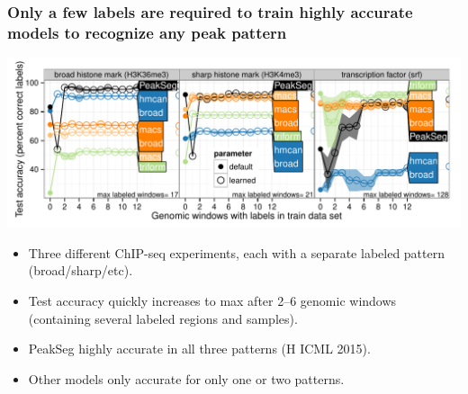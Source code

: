\documentclass{beamer}
\begin{document}
\begin{frame}
  \frametitle{Only a few labels are required to train highly accurate models to recognize any peak pattern}
  \includegraphics[width=1.1\textwidth]{figure-test-error-decreases-mean.pdf}
 
  \begin{itemize}
  \item Three different ChIP-seq experiments, each with a separate
    labeled pattern (broad/sharp/etc).
  \item Test accuracy quickly increases to max after 2--6
    genomic windows (containing several labeled regions and samples).
  \item PeakSeg highly accurate in all three patterns (H ICML 2015).
  \item Other models only accurate for only one or two patterns.
  \end{itemize}
\end{frame}
\end{document}
